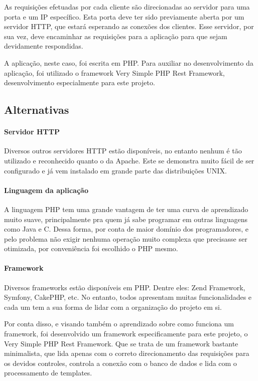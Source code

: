 \documentclass[graduacao,brazil]{ThesisPUC}
\begin{document}
As requisições efetuadas por cada cliente são direcionadas ao servidor para uma porta e um IP específico. Esta porta deve ter sido previamente aberta por um servidor HTTP, que estará esperando as conexões dos clientes. Esse servidor, por sua vez, deve encaminhar as requisições para a aplicação para que sejam devidamente respondidas.

A aplicação, neste caso, foi escrita em PHP. Para auxiliar no desenvolvimento da aplicação, foi utilizado o framework Very Simple PHP Rest Framework, desenvolvimento especialmente para este projeto.

\subsection{Alternativas}

\paragraph{Servidor HTTP}

Diversos outros servidores HTTP estão disponíveis, no entanto nenhum é tão utilizado e reconhecido quanto o da Apache. Este se demonstra muito fácil de ser configurado e já vem instalado em grande parte das distribuições UNIX.

\paragraph{Linguagem da aplicação}

A linguagem PHP tem uma grande vantagem de ter uma curva de aprendizado muito suave, principalmente pra quem já sabe programar em outras linguagens como Java e C. Dessa forma, por conta de maior domínio dos programadores, e pelo problema não exigir nenhuma operação muito complexa que precisasse ser otimizada, por conveniência foi escolhido o PHP mesmo.

\paragraph{Framework}

Diversos frameworks estão disponíveis em PHP. Dentre eles: Zend Framework, Symfony, CakePHP, etc. No entanto, todos apresentam muitas funcionalidades e cada um tem a sua forma de lidar com a organização do projeto em si. 

Por conta disso, e visando também o aprendizado sobre como funciona um framework, foi desenvolvido um framework especificamente para este projeto, o Very Simple PHP Rest Framework. Que se trata de um framework bastante minimalista, que lida apenas com o correto direcionamento das requisições para os devidos controles, controla a conexão com o banco de dados e lida com o processamento de templates.
\end{document}

